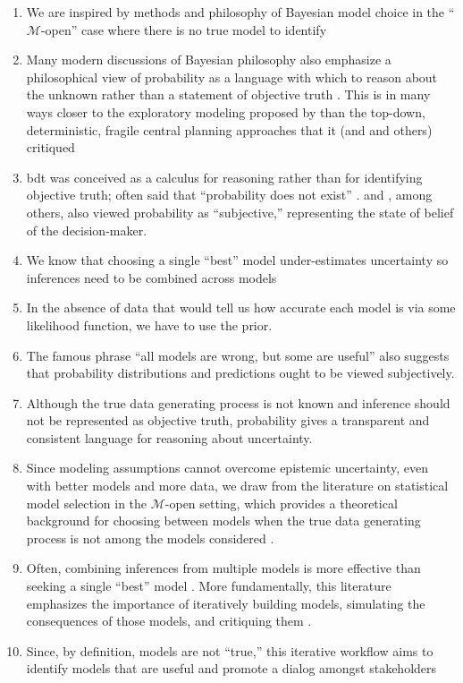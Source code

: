 \documentclass[11pt]{article}
\makeatletter
\DeclareRobustCommand\onedot{\futurelet\@let@token\@onedot}
\def\@onedot{\ifx\@let@token.\else.\null\fi\xspace}
\def\eg{\emph{e.g}\onedot} \def\Eg{\emph{E.g}\onedot}
\DeclareRobustCommand\onedot{\futurelet\@let@token\@onedot}
\def\@onedot{\ifx\@let@token.\else.\null\fi\xspace}
\def\eg{\emph{e.g}\onedot} \def\Eg{\emph{E.g}\onedot}
\makeatother
\begin{document}
\begin{enumerate}
    \item We are inspired by methods and philosophy of Bayesian model choice in the ``$\mathcal{M}$-open'' case where there is no true model to identify
    \item Many modern discussions of Bayesian philosophy \citep{jaynes_probability:2003,McElreath:2016vu,Gelman:2014tc,bernardo_bayesian:1994} also emphasize a philosophical view of probability as a language with which to reason about the unknown rather than a statement of objective truth \citep[see][for a thorough discussion of Bayesian philosophy]{gelman_philosophy:2013}. This is in many ways closer to the exploratory modeling proposed by \citet{bankes:1993} than the top-down, deterministic, fragile central planning approaches that it (and \cite{rittel:1973} and others) critiqued
    \item \gls{bdt} was conceived as a calculus for reasoning rather than for identifying objective truth; \citeauthor{definetti_probability:1972} often said that ``probability does not exist'' \citeyear{definetti_probability:1972}. \citet{savage:1954} and \citet{ramsey_probability:2016}, among others, also viewed probability as ``subjective,'' representing the state of belief of the decision-maker.
    \item We know that choosing a single ``best'' model under-estimates uncertainty so inferences need to be combined across models \citep[\eg, as in stacking;][]{Yao:2018bu}
    \item In the absence of data that would tell us how accurate each model is via some likelihood function, we have to use the prior.
    \item The famous phrase ``all models are wrong, but some are useful'' \citep[generally attributed to][]{box:1976} also suggests that probability distributions and predictions ought to be viewed subjectively.
    \item Although the true data generating process is not known and inference should not be represented as objective truth, probability gives a transparent and consistent language for reasoning about uncertainty.
    \item Since modeling assumptions cannot overcome epistemic uncertainty, even with better models and more data, we draw from the literature on statistical model selection in the $\mathcal{M}$-open setting, which provides a theoretical background for choosing between models when the true data generating process is not among the models considered \citep[see][]{Piironen:2017eh}.
    \item Often, combining inferences from multiple models is more effective than seeking a single ``best'' model \citep{Yao:2018bu}. More fundamentally, this literature emphasizes the importance of iteratively building models, simulating the consequences of those models, and critiquing them \citep{gelman_workflow:2020}.
    \item Since, by definition, models are not ``true,'' this iterative workflow \citep{gelman_workflow:2020} aims to identify models that are useful and promote a dialog amongst stakeholders \citep{gelman_philosophy:2013}
\end{enumerate}
\end{document}
